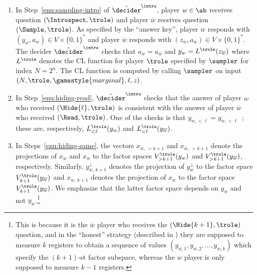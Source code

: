 \begin{enumerate}
\item In Step~\ref{enu:sampling-intro} of $\tdint$, player $w \in \ab$
  receives question $(\Introspect,\trole)$ and player $\overline{w}$ receives
  question $(\Sample,\trole)$.
  As specified by the ``answer key'', player $w$ responds with $(y_w,a_w) \in V
  \times \{0,1\}^*$ and player $\overline{w}$ responds with
  $(z_{\overline{w}},a_{\overline{w}}) \in V \times \{0,1\}^*$.
  The decider $\tdint$ checks that $a_w = a_{\overline{w}}$ and $y_w =
  L^\trole(z_{\overline{w}})$ where $L^\trole$ denotes the CL function for
  player $\trole$ specified by $\sampler$ for index $N = 2^n$.
  The CL function is computed by calling $\sampler$ on input
  $(N, \trole, \gamestyle{marginal}, \ell, z)$.

\item In Step~\ref{enu:hiding-read}, $\tdint$ checks that the answer of
  player $w$ who received $(\Hide{\ell},\trole)$ is consistent with the answer
  of player $\overline{w}$ who received $(\Read,\trole)$. One of the checks is
  that $y_{w,< \ell} = y_{\overline{w},<\ell}$~; these are, respectively, 
  $L^\trole_{< \ell}(y_w)$ and $L^\trole_{< \ell}(y_{\overline{w}})$.
  


\item\label{enu:decider-perp}
  \def\Lfunc{L^{\trole}_{k+1,\, y_{\overline{w},\, \le k}}}

  In Steps~\ref{enu:hiding-same}, the vectors $x_{w,\, >k+1}$ and
  $x_{\overline{w},\, >k+1}$ denote the projections of $x_w$ and
  $x_{\overline{w}}$ to the factor spaces $V^\trole_{> k+1}(y_w)$ and $V^\trole_{>
    k+1}(y_{\overline{w}})$, respectively.
  Similarly, $y_{\overline{w},\, k+1}^\perp$ denotes the projection of
  $y_{\overline{w}}^\perp$ to the factor space $V^\trole_{k+1} (y_{\overline{w}})$ and
  $x_{w,\, k+1}$ denotes the projection of $x_{w}$ to
 the factor space $V^\trole_{k+1}(y_{\overline{w}})$. We emphasize that the latter
 factor space depends on $y_{\overline{w}}$ and not $y_w$.\footnote{ This is because it is the $\overline{w}$ player
 who receives the $(\Hide{k+1},\trole)$ question, and in the ``honest'' strategy (described in ) 
 they are supposed to measure $k$ registers to obtain a sequence of values $(y_{\overline{w},1},y_{\overline{w},2},\ldots,y_{\overline{w},k})$ 
 which specify the $(k+1)$-st factor subspace, whereas the $w$ player is only supposed to measure $k-1$ registers.
 }



\end{enumerate}
